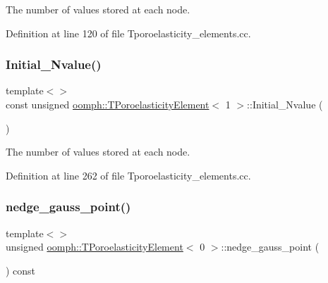The number of values stored at each node. 



Definition at line 120 of file Tporoelasticity\+\_\+elements.\+cc.

\mbox{\label{classoomph_1_1TPoroelasticityElement_a02e257dac8b7d8a26c5d7646a4e19113}} 
\subsubsection{\texorpdfstring{Initial\+\_\+\+Nvalue()}{Initial\_Nvalue()}\hspace{0.1cm}{\footnotesize\ttfamily [2/2]}}
{\footnotesize\ttfamily template$<$$>$ \\
const unsigned \hyperlink{classoomph_1_1TPoroelasticityElement}{oomph\+::\+T\+Poroelasticity\+Element}$<$ 1 $>$\+::Initial\+\_\+\+Nvalue (\begin{DoxyParamCaption}{ }\end{DoxyParamCaption})\hspace{0.3cm}{\ttfamily [private]}}



The number of values stored at each node. 



Definition at line 262 of file Tporoelasticity\+\_\+elements.\+cc.

\mbox{\label{classoomph_1_1TPoroelasticityElement_a7e718424977eb2ce26c0b5f3703ce89f}} 
\subsubsection{\texorpdfstring{nedge\+\_\+gauss\+\_\+point()}{nedge\_gauss\_point()}\hspace{0.1cm}{\footnotesize\ttfamily [1/3]}}
{\footnotesize\ttfamily template$<$$>$ \\
unsigned \hyperlink{classoomph_1_1TPoroelasticityElement}{oomph\+::\+T\+Poroelasticity\+Element}$<$ 0 $>$\+::nedge\+\_\+gauss\+\_\+point (\begin{DoxyParamCaption}{ }\end{DoxyParamCaption}) const\hspace{0.3cm}{\ttfamily [virtual]}}



